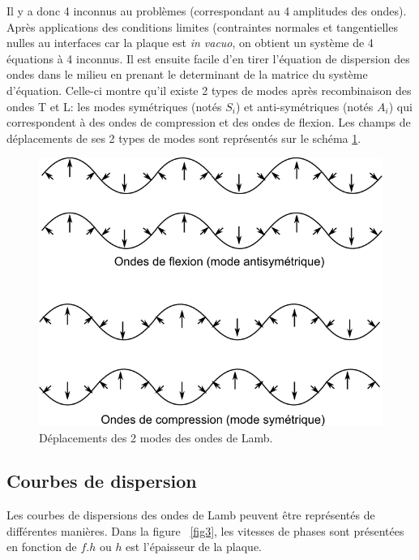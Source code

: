 \documentclass[twoside]{article}
\begin{document}
\begin{multicols}{2}
Il y a donc 4 inconnus au problèmes (correspondant au 4 amplitudes des ondes). Après applications des conditions limites (contraintes normales et tangentielles nulles au interfaces car la plaque est \emph{in vacuo}, on obtient un système de 4 équations à 4 inconnus. Il est ensuite facile d'en tirer l'équation de dispersion des ondes dans le milieu en prenant le determinant de la matrice du système d'équation. Celle-ci montre qu'il existe 2 types de modes après recombinaison des ondes T et L: les modes symétriques (notés $S_i$) et anti-symétriques (notés $A_i$) qui correspondent à des ondes de compression et des ondes de flexion. Les champs de déplacements de ses 2 types de modes sont représentés sur le schéma \ref{fig2}.

\begin{figure}[H]
\centering
\includegraphics[scale=0.4]{./images/modes.png}
\caption{\label{fig2} Déplacements des 2 modes des ondes de Lamb.}
\end{figure}


\subsection{Courbes de dispersion}

Les courbes de dispersions des ondes de Lamb peuvent être représentés de différentes manières. Dans la figure ~\ref{fig3}, les vitesses de phases sont présentées en fonction de $f.h$ ou $h$ est l'épaisseur de la plaque. 





\end{multicols}
\end{document}
